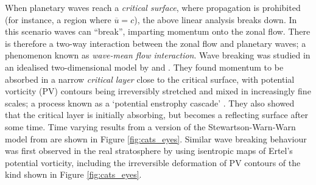 \bigskip When planetary waves reach a \emph{critical surface}, where propagation
is prohibited (for instance, a region where $\overline{u} = c$), the above
linear analysis breaks down. In this scenario waves can ``break'', imparting
momentum onto the zonal flow. There is therefore a two-way interaction between
the zonal flow and planetary waves; a phenomenon known as \emph{wave-mean flow
  interaction}. Wave breaking was studied in an idealised two-dimensional model
by \citet{Stewartson1978} and \citet{Warn1978}. They found momentum to be
absorbed in a narrow \emph{critical layer} close to the critical surface, with
potential vorticity (PV) contours being irreversibly stretched and mixed in
increasingly fine scales; a process known as a `potential enstrophy cascade'
\citep[e.g.,][]{Rhines1979}. They also showed that the critical layer is
initially absorbing, but becomes a reflecting surface after some time. Time
varying results from a version of the Stewartson-Warn-Warn model from
\citet{Andrews1987} are shown in Figure \ref{fig:cats_eyes}. Similar wave
breaking behaviour was first observed in the real stratosphere by
\citet{McIntyre1983} using isentropic maps of Ertel's potential vorticity,
including the irreversible deformation of PV contours of the kind shown in
Figure \ref{fig:cats_eyes}.

